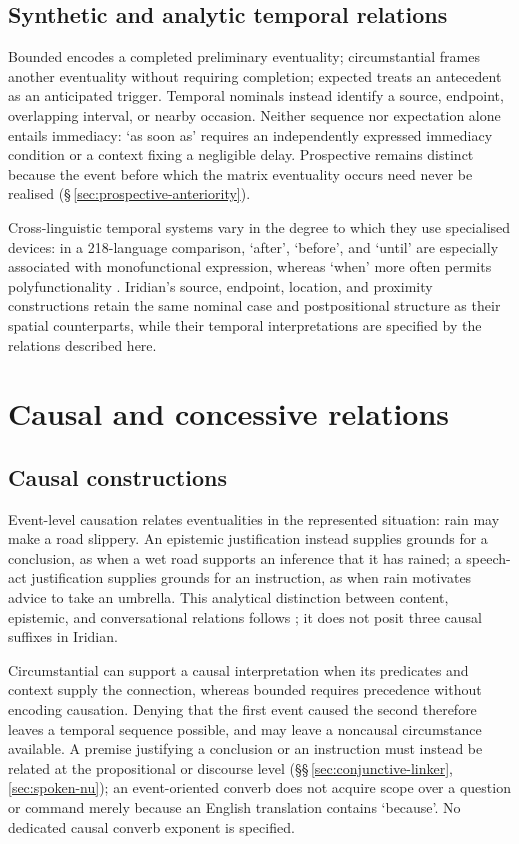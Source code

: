 \subsection{Synthetic and analytic temporal relations}

Bounded  encodes a completed preliminary eventuality;
circumstantial  frames another eventuality without requiring
completion; expected  treats an antecedent as an anticipated
trigger. Temporal nominals instead identify a source, endpoint, overlapping
interval, or nearby occasion. Neither sequence nor expectation alone entails
immediacy: `as soon as' requires an independently expressed immediacy condition
or a context fixing a negligible delay. Prospective  remains
distinct because the event before which the matrix eventuality occurs need
never be realised (§\,\ref{sec:prospective-anteriority}).

Cross-linguistic temporal systems vary in the degree to which they use
specialised devices: in a 218-language comparison, `after', `before', and
`until' are especially associated with monofunctional expression, whereas
`when' more often permits polyfunctionality
\cite[60--61]{olguinmartinez2023}. Iridian's source, endpoint, location, and
proximity constructions retain the same nominal case and postpositional
structure as their spatial counterparts, while their temporal interpretations
are specified by the relations described here.

\section{Causal and concessive relations}

\subsection{Causal constructions}\label{sec:causal}


Event-level causation relates eventualities in the represented situation:
rain may make a road slippery. An epistemic justification instead supplies
grounds for a conclusion, as when a wet road supports an inference that it has
rained; a speech-act justification supplies grounds for an instruction, as
when rain motivates advice to take an umbrella. This analytical distinction
between content, epistemic, and conversational relations follows
\cite[ch.~4]{sweetser1990}; it does not posit three causal suffixes in Iridian.

Circumstantial  can support a causal interpretation when its
predicates and context supply the connection, whereas bounded 
requires precedence without encoding causation. Denying that the first event caused the
second therefore leaves a temporal sequence possible, and may leave a
noncausal circumstance available. A premise justifying a conclusion or an
instruction must instead be related at the propositional or discourse level
(§§\,\ref{sec:conjunctive-linker}, \ref{sec:spoken-nu}); an
event-oriented converb does not acquire scope over a question or command
merely because an English translation contains `because'. No dedicated causal
converb exponent is specified.

